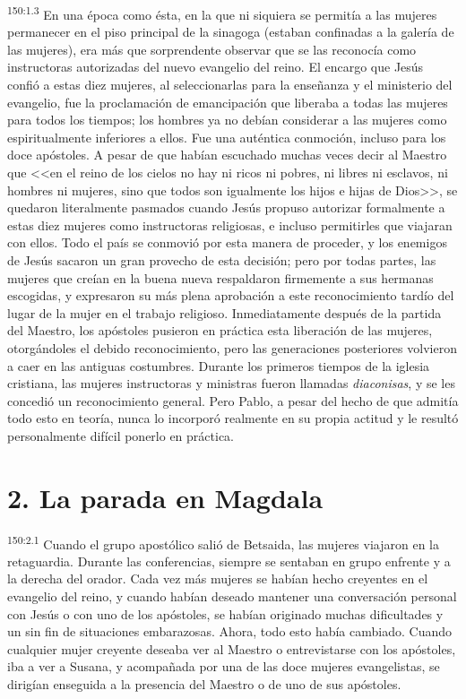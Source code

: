 \par 
\textsuperscript{150:1.3} En una época como ésta, en la que ni siquiera se permitía a las mujeres permanecer en el piso principal de la sinagoga (estaban confinadas a la galería de las mujeres), era más que sorprendente observar que se las reconocía como instructoras autorizadas del nuevo evangelio del reino. El encargo que Jesús confió a estas diez mujeres, al seleccionarlas para la enseñanza y el ministerio del evangelio, fue la proclamación de emancipación que liberaba a todas las mujeres para todos los tiempos; los hombres ya no debían considerar a las mujeres como espiritualmente inferiores a ellos. Fue una auténtica conmoción, incluso para los doce apóstoles. A pesar de que habían escuchado muchas veces decir al Maestro que <<en el reino de los cielos no hay ni ricos ni pobres, ni libres ni esclavos, ni hombres ni mujeres, sino que todos son igualmente los hijos e hijas de Dios>>, se quedaron literalmente pasmados cuando Jesús propuso autorizar formalmente a estas diez mujeres como instructoras religiosas, e incluso permitirles que viajaran con ellos. Todo el país se conmovió por esta manera de proceder, y los enemigos de Jesús sacaron un gran provecho de esta decisión; pero por todas partes, las mujeres que creían en la buena nueva respaldaron firmemente a sus hermanas escogidas, y expresaron su más plena aprobación a este reconocimiento tardío del lugar de la mujer en el trabajo religioso. Inmediatamente después de la partida del Maestro, los apóstoles pusieron en práctica esta liberación de las mujeres, otorgándoles el debido reconocimiento, pero las generaciones posteriores volvieron a caer en las antiguas costumbres. Durante los primeros tiempos de la iglesia cristiana, las mujeres instructoras y ministras fueron llamadas \textit{diaconisas}, y se les concedió un reconocimiento general. Pero Pablo, a pesar del hecho de que admitía todo esto en teoría, nunca lo incorporó realmente en su propia actitud y le resultó personalmente difícil ponerlo en práctica.

\section*{2. La parada en Magdala}
\par 
\textsuperscript{150:2.1} Cuando el grupo apostólico salió de Betsaida, las mujeres viajaron en la retaguardia. Durante las conferencias, siempre se sentaban en grupo enfrente y a la derecha del orador. Cada vez más mujeres se habían hecho creyentes en el evangelio del reino, y cuando habían deseado mantener una conversación personal con Jesús o con uno de los apóstoles, se habían originado muchas dificultades y un sin fin de situaciones embarazosas. Ahora, todo esto había cambiado. Cuando cualquier mujer creyente deseaba ver al Maestro o entrevistarse con los apóstoles, iba a ver a Susana, y acompañada por una de las doce mujeres evangelistas, se dirigían enseguida a la presencia del Maestro o de uno de sus apóstoles.

